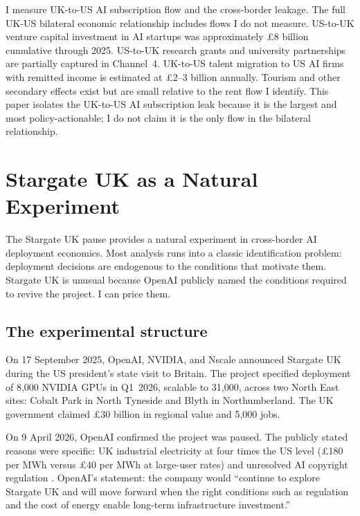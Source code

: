 \documentclass[11pt,letterpaper]{article}
\theoremstyle{remark}
\begin{document}
I measure {UK}-to-{US} {AI} subscription flow and the cross-border leakage. The full {UK}-{US} bilateral economic relationship includes flows I do not measure. {US}-to-{UK} venture capital investment in {AI} startups was approximately \pounds8 billion cumulative through 2025. {US}-to-{UK} research grants and university partnerships are partially captured in Channel~4. {UK}-to-{US} talent migration to {US} {AI} firms with remitted income is estimated at \pounds2--3 billion annually. Tourism and other secondary effects exist but are small relative to the rent flow I identify. This paper isolates the {UK}-to-{US} {AI} subscription leak because it is the largest and most policy-actionable; I do not claim it is the only flow in the bilateral relationship.

\section{Stargate {UK} as a Natural Experiment}

The Stargate {UK} pause provides a natural experiment in cross-border {AI} deployment economics. Most analysis runs into a classic identification problem: deployment decisions are endogenous to the conditions that motivate them. Stargate {UK} is unusual because OpenAI publicly named the conditions required to revive the project. I can price them.

\subsection{The experimental structure}

On 17 September 2025, OpenAI, NVIDIA, and Nscale announced Stargate {UK} during the {US} president's state visit to Britain. The project specified deployment of 8{,}000 NVIDIA {GPUs} in Q1~2026, scalable to 31{,}000, across two North East sites: Cobalt Park in North Tyneside and Blyth in Northumberland. The {UK} government claimed \pounds30 billion in regional value and 5{,}000 jobs.

On 9 April 2026, OpenAI confirmed the project was paused. The publicly stated reasons were specific: {UK} industrial electricity at four times the {US} level (\pounds180 per {MWh} versus \pounds40 per {MWh} at large-user rates) and unresolved {AI} copyright regulation \citep{iea_2026}. OpenAI's statement: the company would ``continue to explore Stargate {UK} and will move forward when the right conditions such as regulation and the cost of energy enable long-term infrastructure investment.''
\end{document}
